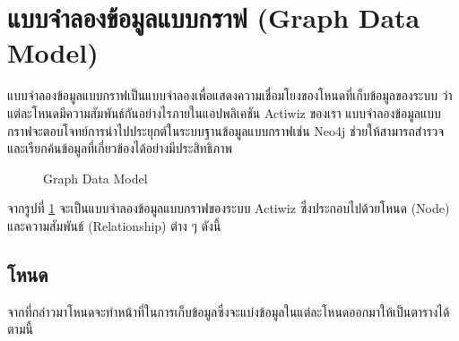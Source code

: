 \documentclass[14pt,oneside,openright,a4paper]{cpe-thai-project}
\begin{document}
\section{แบบจำลองข้อมูลแบบกราฟ (Graph Data Model)}
แบบจำลองข้อมูลแบบกราฟเป็นแบบจำลองเพื่อแสดงความเชื่อมโยงของโหนดที่เก็บข้อมูลของระบบ ว่าแต่ละโหนดมีความสัมพันธ์กันอย่างไรภายในแอปพลิเคชัน Actiwiz ของเรา แบบจำลองข้อมูลแบบกราฟจะตอบโจทย์การนำไปประยุกต์ในระบบฐานข้อมูลแบบกราฟเช่น Neo4j ช่วยให้สามารถสำรวจและเรียกค้นข้อมูลที่เกี่ยวข้องได้อย่างมีประสิทธิภาพ
  \begin{figure}[!h]\centering
    \setlength{\fboxrule}{0.5mm} %
    \setlength{\fboxsep}{0.5cm}
    \caption{Graph Data Model}\label{fig:Graph Data Model}
  \end{figure}
  \FloatBarrier
จากรูปที่ \ref{fig:Graph Data Model} จะเป็นแบบจำลองข้อมูลแบบกราฟของระบบ Actiwiz ซึ่งประกอบไปด้วยโหนด (Node) และความสัมพันธ์ (Relationship) ต่าง ๆ ดังนี้
\newpage
\subsection{โหนด}
    จากที่กล่าวมาโหนดจะทำหน้าที่ในการเก็บข้อมูลซึ่งจะแบ่งข้อมูลในแต่ละโหนดออกมาให้เป็นตารางได้ตามนี้
\end{document}
